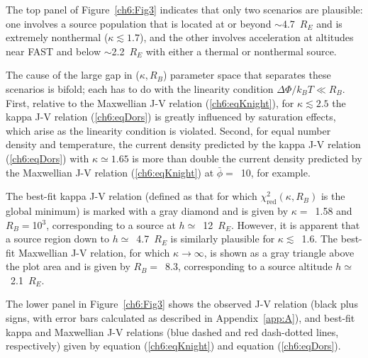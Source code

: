   The top panel of Figure~\ref{ch6:Fig3} indicates that only two scenarios are
  plausible: one involves a source population that is located at or beyond
  $\sim$4.7~$R_E$ and is extremely nonthermal ($\kappa \lesssim 1.7$), and the
  other involves acceleration at altitudes near FAST and below $\sim$2.2~$R_E$
  with either a thermal or nonthermal source.

  The cause of the large gap in ($\kappa, R_B$) parameter space that separates
  these scenarios is bifold; each has to do with the linearity condition
  $\Delta \Phi / k_B T \ll R_B $. First, relative to the Maxwellian J-V relation
  (\ref{ch6:eqKnight}), for $\kappa \lesssim 2.5$ the kappa J-V relation
  (\ref{ch6:eqDors}) is greatly influenced by saturation effects, which arise as
  the linearity condition is violated. Second, for equal number density and
  temperature, the current density predicted by the kappa J-V relation
  (\ref{ch6:eqDors}) with $\kappa \simeq 1.65$ is more than double the current
  density predicted by the Maxwellian J-V relation (\ref{ch6:eqKnight}) at
  $\bar{\phi} =$~10, for example.

  The best-fit kappa J-V relation (defined as that for which
  $\chi^2_{\textrm{red}} ( \kappa, R_B )$ is the global minimum) is marked with
  a gray diamond and is given by $\kappa =$~1.58 and $R_B =$10$^3$,
  corresponding to a source at $h \simeq$~12~$R_E$. However, it is apparent that
  a source region down to $h \simeq$~4.7~$R_E$ is similarly plausible for
  $\kappa \lesssim$~1.6. The best-fit Maxwellian J-V relation, for which
  $\kappa \rightarrow \infty$, is shown as a gray triangle above the plot area
  and is given by $R_B =$~8.3, corresponding to a source altitude
  $h \simeq$~2.1~$R_E$.

  The lower panel in Figure~\ref{ch6:Fig3} shows the observed J-V relation
  (black plus signs, with error bars calculated as described in
  Appendix~\ref{app:A}), and best-fit kappa and Maxwellian J-V relations (blue
  dashed and red dash-dotted lines, respectively) given by equation
  (\ref{ch6:eqKnight}) and equation (\ref{ch6:eqDors}).

